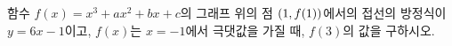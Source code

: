 함수 $f(x)=x^3+ax^2+bx+c$의 그래프 위의 점 $(1{,}\mkern3mu\mathopen{}f(1))$에서의 접선의 방정식이 $y=6x-1$이고, $f(x)$는 $x=-1$에서 극댓값을 가질 때, $f(3)$의 값을 구하시오. 
